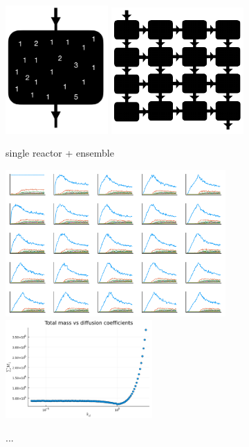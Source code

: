 \documentclass[11pt]{article}
\begin{document}
\begin{figure}
  \centering
  \includegraphics[width=0.35\textwidth]{figures/system/single-reactor.pdf}
  \includegraphics[width=0.45\textwidth]{figures/system/ensemble.pdf}
  \caption{single reactor + ensemble}
\end{figure}

\begin{figure}
  \centering
  \includegraphics[width=0.75\textwidth]{figures/results/1-prelim/ts-gridplot.pdf}
  \includegraphics[width=0.50\textwidth]{figures/results/1-prelim/mass.pdf}
  \caption{...}
  \label{fig:prelim-gridplot}
\end{figure}
\end{document}
